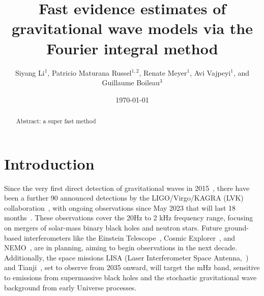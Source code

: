 \documentclass[%
 reprint,
 amsmath,amssymb,
 aps,
]{revtex4-2}
\begin{document}

\title{Fast evidence estimates of gravitational wave models via the Fourier integral method}

\author{Siyang Li$^{1}$,  Patricio Maturana Russel$^{1,2}$, Renate Meyer$^1$, Avi Vajpeyi$^1$, and Guillaume Boileau$^3$}

\newcommand{\pmr}[1]{\textcolor{purple}{[PMR: #1]}}
\newcommand{\jason}[1]{\textcolor{blue}{[jason: #1]}}
\newcommand{\avi}[1]{\textcolor{orange}{[Avi: #1]}}
\newcommand{\RM}[1]{\textcolor{green}{[Renate: #1]}}
\newcommand{\todo}[1]{\textcolor{olive}{TODO: #1}}
\newcommand{\citeme}{\textcolor{purple}{(cite)}}



\date{\today}%

\begin{abstract}
Abstract: a super fast method
\end{abstract}

\maketitle


\section{\label{sec:introduction} Introduction}
Since the very first direct detection of gravitational waves in 2015~\cite{GW150914}, there have been a further 90 announced detections by the LIGO/Virgo/KAGRA (LVK) collaboration~\cite{LIGO, VIRGO, KAGRA, GWTC3}, with ongoing observations since May 2023 that will last 18 months~\cite{}. These observations cover the 20Hz to 2 kHz frequency range, focusing on mergers of solar-mass binary black holes and neutron stars. Future ground-based interferometers like the Einstein Telescope~\cite{}, Cosmic Explorer~\cite{}, and NEMO~\cite{}, are in planning, aiming to begin observations in the next decade. Additionally, the space missions LISA (Laser Interferometer Space Antenna,~\cite{}) and Tianji~\cite{}, set to observe from 2035 onward, will target the mHz band, sensitive to emissions from supermassive black holes and the stochastic gravitational wave background from early Universe processes.
\end{document}
